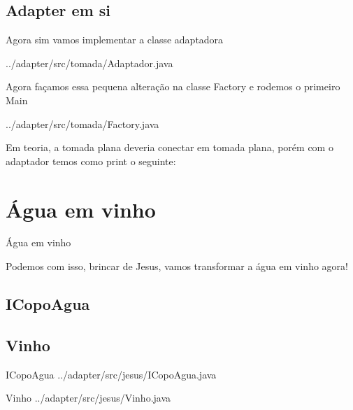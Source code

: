 \documentclass{if-beamer}
\begin{document}
\begin{frame}
	
	\subsection{Adapter em si}
	\begin{exampleblock}

		Agora sim vamos implementar a classe adaptadora
	\end{exampleblock}

	 {../adapter/src/tomada/Adaptador.java}

\end{frame}

\begin{frame}
	
	\begin{exampleblock}

		Agora façamos essa pequena alteração na classe Factory e rodemos o primeiro Main
	\end{exampleblock}

	 {../adapter/src/tomada/Factory.java}

	\begin{alertblock}

		Em teoria, a tomada plana deveria conectar em tomada plana, porém com o adaptador temos como print o seguinte: 
	\end{alertblock}

\end{frame}

\section{Água em vinho}
\begin{frame}{Água em vinho}
	\begin{block}

		Podemos com isso, brincar de Jesus, vamos transformar a água em vinho agora!
	\end{block}
	\subsection{ICopoAgua}
	\subsection{Vinho}
	\begin{block}{ICopoAgua}
		 {../adapter/src/jesus/ICopoAgua.java}
	\end{block}

	\begin{block}{Vinho}
		 {../adapter/src/jesus/Vinho.java}
	\end{block}
\end{frame}
\end{document}
